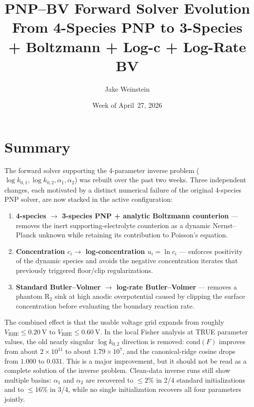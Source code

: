 \documentclass[11pt]{article}
\title{PNP--BV Forward Solver Evolution\\
       From 4-Species PNP to 3-Species + Boltzmann + Log-c + Log-Rate BV}
\author{Jake Weinstein}
\date{Week of April~27, 2026}
\newcommand{\VRHE}{V_{\mathrm{RHE}}}
\begin{document}
\maketitle

\section{Summary}
The forward solver supporting the 4-parameter inverse problem
($\log k_{0,1}, \log k_{0,2}, \alpha_1, \alpha_2$) was rebuilt over the past
two weeks. Three independent changes, each motivated by a distinct numerical
failure of the original 4-species PNP solver, are now stacked in the active
configuration:
\begin{enumerate}
  \item \textbf{4-species $\to$ 3-species PNP + analytic Boltzmann counterion}
        --- removes the inert supporting-electrolyte counterion as a dynamic
        Nernst--Planck unknown while retaining its contribution to Poisson's
        equation.
  \item \textbf{Concentration $c_i \to$ log-concentration $u_i = \ln c_i$}
        --- enforces positivity of the dynamic species and avoids the negative
        concentration iterates that previously triggered floor/clip
        regularizations.
  \item \textbf{Standard Butler--Volmer $\to$ log-rate Butler--Volmer}
        --- removes a phantom $\mathrm{R}_2$ sink at high anodic overpotential
        caused by clipping the surface concentration before evaluating the
        boundary reaction rate.
\end{enumerate}
The combined effect is that the usable voltage grid expands from roughly
$\VRHE \le \SI{+0.20}{\volt}$ to $\VRHE \le \SI{+0.60}{\volt}$. In the local
Fisher analysis at TRUE parameter values, the old nearly singular
$\log k_{0,2}$ direction is removed: $\mathrm{cond}(F)$ improves from about
$2\times 10^{11}$ to about $1.79\times 10^{7}$, and the canonical-ridge cosine
drops from $1.000$ to $0.031$. This is a major improvement, but it should not
be read as a complete solution of the inverse problem. Clean-data inverse runs
still show multiple basins: $\alpha_1$ and $\alpha_2$ are recovered to
$\le 2\%$ in 2/4 standard initializations and to $\le 16\%$ in 3/4, while no
single initialization recovers all four parameters jointly.

\end{document}
